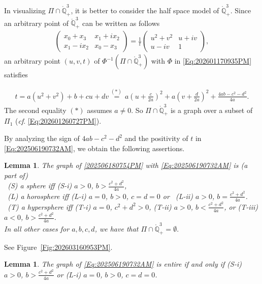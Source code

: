 \documentclass[12pt,reqno]{amsart}
\theoremstyle{plain} %
\newtheorem{lemma}[theorem]{Lemma}
\theoremstyle{definition}
\numberwithin{equation}{section}
\newcommand{\qthreept}{\mathring{\mathbb{Q}}^3_+}
\begin{document}
In visualizing $\Pi \cap \qthreept$, it is better to consider the half space model of $\qthreept$.
Since an arbitrary point of $\qthreept$ can be written as follows
\begin{align}\label{202506180754PM}
	\begin{pmatrix} x_0+x_3 & x_1+ix_2 \\ x_1-i x_2 & x_0-x_3 \end{pmatrix}
	= \frac{1}{t} \begin{pmatrix} u^2 + v^2 & u + i v \\ u - i v & 1 \end{pmatrix},
\end{align}
an  arbitrary point $(u,v,t)$ of  $\Phi^{-1} (\Pi \cap \qthreept)$  with $\Phi$ in \eqref{Eq:202601170935PM} satisfies

\begin{align}\label{Eq:202506190732AM}
	t = a(u^2+v^2)+ b + cu + dv \overset{(*)~}{=} a(u+\tfrac{c}{2a})^2 + a (v + \tfrac{d}{2a})^2 + \tfrac{4ab-c^2-d^2}{4a}.
\end{align}
The second equality $(*)$ assumes $a\not=0$.
So $\Pi \cap \qthreept$ is a graph over a subset of $\Pi_1$ (\textit{cf}. \eqref{Eq:202601260727PM}).

By analyzing the sign of $4ab-c^2-d^2$ and the positivity of $t$ in \eqref{Eq:202506190732AM}, we obtain the following assertions.
\begin{lemma}\label{Lem:202601171034AM}
	The graph of \eqref{202506180754PM} with \eqref{Eq:202506190732AM} is (a part of) \\
	\  (S) a sphere  iff  (S-i)  $a>0$, $b>\tfrac{c^2+d^2}{4a}$, \\
	\  (L) a horosphere iff  (L-i) $a=0$, $b>0$, $c=d=0$ or \ (L-ii) $a > 0$, $b= \frac{c^2+d^2}{4a}$. \\
	\  (T) a hypersphere iff (T-i) $a=0$, $c^2+d^2>0$, (T-ii) $a >0$, $b<\tfrac{c^2+d^2}{4a}$,
	or  (T-iii) $a<0$, $b>\tfrac{c^2+d^2}{4a}$. \\
	In all other cases for $a,b,c,d$, we have that $\Pi \cap \qthreept = \emptyset.$
\end{lemma}
See Figure~\ref{Fig:202603160953PM}.
\begin{lemma}\label{Lem:202601171033AM}
	The graph of \eqref{Eq:202506190732AM} is entire if and only if (S-i)  $a>0$, $b>\tfrac{c^2+d^2}{4a}$ or (L-i) $a=0$, $b>0$, $c=d=0$.
\end{lemma}
\end{document}

